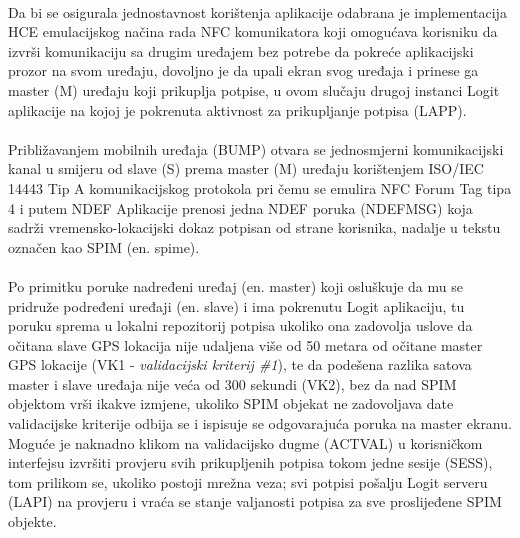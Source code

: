 \paragraph*{}
Da bi se osigurala jednostavnost korištenja aplikacije odabrana je implementacija HCE emulacijskog načina rada NFC komunikatora koji omogućava korisniku da izvrši komunikaciju sa drugim uređajem bez potrebe da pokreće aplikacijski prozor na svom uređaju, dovoljno je da upali ekran svog uređaja i prinese ga master (M) uređaju koji prikuplja potpise, u ovom slučaju drugoj instanci Logit aplikacije na kojoj je pokrenuta aktivnost za prikupljanje potpisa (LAPP).

\paragraph*{}
Približavanjem mobilnih uređaja (BUMP) otvara se jednosmjerni komunikacijski kanal u smijeru od slave (S) prema master (M) uređaju korištenjem ISO/IEC 14443 Tip A komunikacijskog protokola pri čemu se emulira NFC Forum Tag tipa 4 i putem NDEF Aplikacije prenosi jedna NDEF poruka (NDEFMSG) koja sadrži vremensko-lokacijski dokaz potpisan od strane korisnika, nadalje u tekstu označen kao SPIM (en. spime)\cite{bruces}.

\paragraph*{}
Po primitku poruke nadređeni uređaj (en. master) koji osluškuje da mu se pridruže podređeni uređaji (en. slave) i ima pokrenutu Logit aplikaciju, tu poruku sprema u lokalni repozitorij potpisa ukoliko ona zadovolja uslove da očitana slave GPS lokacija nije udaljena više od 50 metara od očitane master GPS lokacije (VK1 - \textit{validacijski kriterij \#1}), te da podešena razlika satova master i slave uređaja nije veća od 300 sekundi (VK2), bez da nad SPIM objektom vrši ikakve izmjene, ukoliko SPIM objekat ne zadovoljava date validacijske kriterije odbija se i ispisuje se odgovarajuća poruka na master ekranu. Moguće je naknadno klikom na validacijsko dugme (ACTVAL) u korisničkom interfejsu izvršiti provjeru svih prikupljenih potpisa tokom jedne sesije (SESS), tom prilikom se, ukoliko postoji mrežna veza; svi potpisi pošalju Logit serveru (LAPI) na provjeru i vraća se stanje valjanosti potpisa za sve proslijeđene SPIM objekte.

